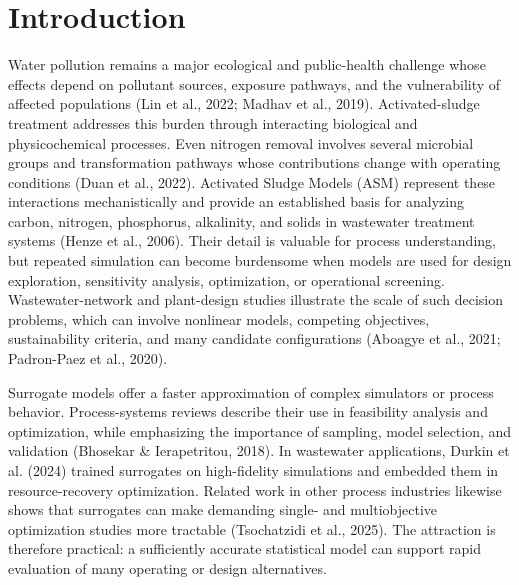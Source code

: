 \documentclass[a4paper,fleqn]{cas-sc}
\begin{document}
\section{Introduction}

Water pollution remains a major ecological and public-health challenge whose effects depend on pollutant sources, exposure pathways, and the vulnerability of affected populations (Lin et al., 2022; Madhav et al., 2019). Activated-sludge treatment addresses this burden through interacting biological and physicochemical processes. Even nitrogen removal involves several microbial groups and transformation pathways whose contributions change with operating conditions (Duan et al., 2022). Activated Sludge Models (ASM) represent these interactions mechanistically and provide an established basis for analyzing carbon, nitrogen, phosphorus, alkalinity, and solids in wastewater treatment systems (Henze et al., 2006). Their detail is valuable for process understanding, but repeated simulation can become burdensome when models are used for design exploration, sensitivity analysis, optimization, or operational screening. Wastewater-network and plant-design studies illustrate the scale of such decision problems, which can involve nonlinear models, competing objectives, sustainability criteria, and many candidate configurations (Aboagye et al., 2021; Padron-Paez et al., 2020).

Surrogate models offer a faster approximation of complex simulators or process behavior. Process-systems reviews describe their use in feasibility analysis and optimization, while emphasizing the importance of sampling, model selection, and validation (Bhosekar \& Ierapetritou, 2018). In wastewater applications, Durkin et al. (2024) trained surrogates on high-fidelity simulations and embedded them in resource-recovery optimization. Related work in other process industries likewise shows that surrogates can make demanding single- and multiobjective optimization studies more tractable (Tsochatzidi et al., 2025). The attraction is therefore practical: a sufficiently accurate statistical model can support rapid evaluation of many operating or design alternatives.
\end{document}
